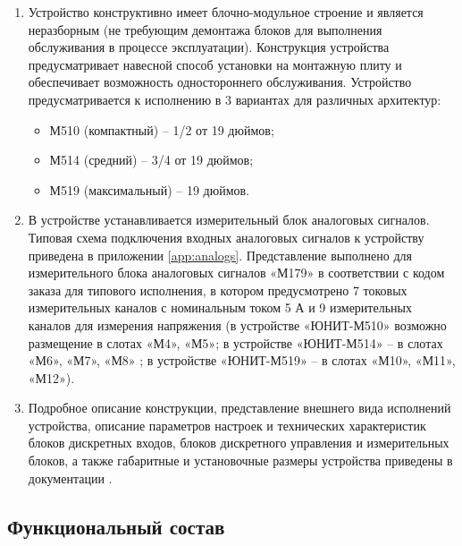 \begin{enumerate}[label=\arabic{section}.\arabic{subsection}.\arabic*, labelsep=4pt, leftmargin=0pt, itemindent=57pt]

\item
Устройство конструктивно имеет блочно-модульное строение и является неразборным (не требующим демонтажа блоков для выполнения обслуживания в процессе эксплуатации). 
Конструкция устройства предусматривает навесной способ установки на монтажную плиту и обеспечивает возможность одностороннего обслуживания.
Устройство предусматривается к исполнению в 3 вариантах для различных архитектур:
\begin{itemize}
\item М510 (компактный) – 1/2 от 19 дюймов;
\item М514 (средний) – 3/4 от 19 дюймов;
\item М519 (максимальный) – 19 дюймов.
\end{itemize}

\item
В устройстве устанавливается измерительный блок аналоговых сигналов. Типовая схема подключения входных аналоговых сигналов к устройству приведена в приложении \ref{app:analogs}. Представление выполнено для измерительного блока аналоговых сигналов «М179» в соответствии с кодом заказа для типового исполнения, в котором предусмотрено 7 токовых измерительных каналов с номинальным током 5 А и 9 измерительных каналов для измерения напряжения (в устройстве «ЮНИТ-М510» возможно размещение в слотах «М4», «М5»; в устройстве «ЮНИТ-М514» -- в слотах «М6», «М7», «М8» ; в устройстве «ЮНИТ-М519» -- в слотах «М10», «М11», «М12»).

\item
Подробное описание конструкции, представление внешнего вида исполнений устройства, описание параметров настроек и технических характеристик блоков дискретных входов, блоков дискретного управления и измерительных блоков, а также габаритные и установочные размеры устройства приведены в документации \ManualUnitGeneral.

\end{enumerate}

\color{unidarkgreen}\subsection{Функциональный состав}
\color{black}

